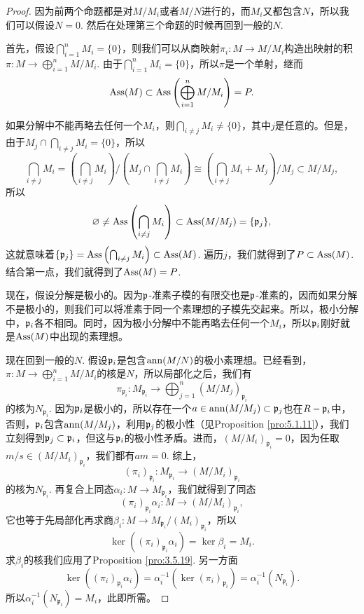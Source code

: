 \begin{proof}
	因为前两个命题都是对$M/M_i$或者$M/N$进行的，而$M_i$又都包含$N$，所以我们可以假设$N=0$. 然后在处理第三个命题的时候再回到一般的$N$.

	首先，假设$\bigcap_{i=1}^n M_i=\{0\}$，则我们可以从商映射$\pi_i:M\to M/M_i$构造出映射的积$\pi:M\to \bigoplus_{i=1}^n M/M_i$. 由于$\bigcap_{i=1}^n M_i=\{0\}$，所以$\pi$是一个单射，继而
	\[
		\operatorname{Ass}(M)\subset \operatorname{Ass}\left(\bigoplus_{i=1}^n M/M_i\right)=P.
	\]

	如果分解中不能再略去任何一个$M_i$，则$\bigcap_{i\neq j}M_i\neq \{0\}$，其中$j$是任意的。但是，由于$M_j\cap \bigcap_{i\neq j}M_i= \{0\}$，所以
	\[
		\bigcap_{i\neq j}M_i=\left(\bigcap_{i\neq j}M_i\right)\bigg/ \left(M_j\cap \bigcap_{i\neq j}M_i\right)\cong \left(\bigcap_{i\neq j}M_i+M_j\right)/M_j\subset M/M_j,
	\]
	所以
	\[
		\varnothing\neq \operatorname{Ass}\left(\bigcap_{i\neq j}M_i\right)\subset \operatorname{Ass}(M/M_j)=\{\mathfrak{p}_j\},
	\]
	这就意味着$\{\mathfrak{p}_j\}=\operatorname{Ass}\left(\bigcap_{i\neq j}M_i\right)\subset \operatorname{Ass}(M)$. 遍历$j$，我们就得到了$P\subset \operatorname{Ass}(M)$. 结合第一点，我们就得到了$\operatorname{Ass}(M)=P$.

	现在，假设分解是极小的。因为$\mathfrak{p}$-准素子模的有限交也是$\mathfrak{p}$-准素的，因而如果分解不是极小的，则我们可以将准素于同一个素理想的子模先交起来。所以，极小分解中，$\mathfrak{p}_i$各不相同。同时，因为极小分解中不能再略去任何一个$M_i$，所以$\mathfrak{p}_i$刚好就是$\operatorname{Ass}(M)$中出现的素理想。

	现在回到一般的$N$. 假设$\mathfrak{p}_i$是包含$\operatorname{ann} (M/N)$的极小素理想。已经看到，$\pi:M\to \bigoplus_{i=1}^n M/M_i$的核是$N$，所以局部化之后，我们有
	\[
		\pi_{\mathfrak p_i}:M_{\mathfrak p_i}\to \bigoplus_{j=1}^n (M/M_j)_{\mathfrak p_i}
	\]
	的核为$N_{\mathfrak p_i}$. 因为$\mathfrak{p}_i$是极小的，所以存在一个$a\in \operatorname{ann}(M/M_j)\subset \mathfrak{p}_j$也在$R-\mathfrak{p}_i$中，否则，$\mathfrak{p}_i$包含$\operatorname{ann}(M/M_j)$，利用$\mathfrak{p}_j$的极小性（见Proposition \ref{pro:5.1.11}），我们立刻得到$\mathfrak{p}_j\subset \mathfrak{p}_i$，但这与$\mathfrak{p}_i$的极小性矛盾。进而，$(M/M_i)_{\mathfrak p_i}=0$，因为任取$m/s\in (M/M_i)_{\mathfrak p_i}$，我们都有$am=0$. 综上，
	\[
		(\pi_i)_{\mathfrak p_i}:M_{\mathfrak p_i}\to  (M/M_i)_{\mathfrak p_i}
	\]
	的核为$N_{\mathfrak p_i}$. 再复合上同态$\alpha_i:M\to M_{\mathfrak p_i}$，我们就得到了同态
	\[
		(\pi_i)_{\mathfrak p_i}\alpha_i:M\to  (M/M_i)_{\mathfrak p_i},
	\]
	它也等于先局部化再求商$\beta_i:M\to  M_{\mathfrak p_i}/(M_i)_{\mathfrak p_i}$，所以
	\[
		\ker ((\pi_i)_{\mathfrak p_i}\alpha_i)=\ker \beta_i=M_i.
	\]
	求$\beta_i$的核我们应用了Proposition \ref{pro:3.5.19}. 另一方面
	\[
		\ker ((\pi_i)_{\mathfrak p_i}\alpha_i)=\alpha_i^{-1}(\ker (\pi_i)_{\mathfrak p_i})=\alpha_i^{-1}(N_{\mathfrak p_i}).
	\]
	所以$\alpha_i^{-1}(N_{\mathfrak p_i})=M_i$，此即所需。
\end{proof}

